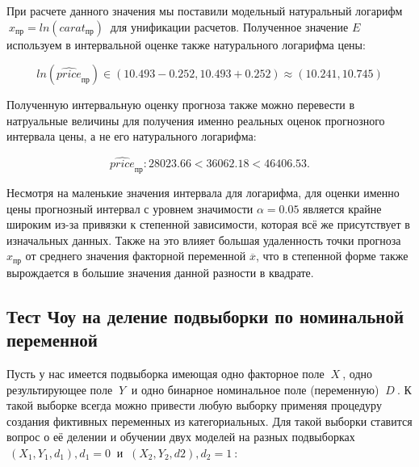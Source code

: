 \documentclass[
]{article}
\begin{document}
При расчете данного значения мы поставили модельный натуральный логарифм
\(\ x_\text{пр} = ln(carat_{\text{пр}})\ \) для унификации расчетов.
Полученное значение \(E\) используем в интервальной оценке также
натурального логарифма цены:

\[
ln(\hat{price}_{пр}) \in \left( 10.493 - 0.252, 10.493 + 0.252 \right) \approx \left( 10.241, 10.745 \right)
\]

Полученную интервальную оценку прогноза также можно перевести в
натруальные величины для получения именно реальных оценок прогнозного
интервала цены, а не его натурального логарифма:

\[
\hat{price}_{пр}: 28023.66 < 36062.18 < 46406.53.
\]

Несмотря на маленькие значения интервала для логарифма, для оценки
именно цены прогнозный интервал с уровнем значимости \(\alpha = 0.05\)
является крайне широким из-за привязки к степенной зависимости, которая
всё же присутствует в изначальных данных. Также на это влияет большая
удаленность точки прогноза \(x_{пр}\) от среднего значения факторной
переменной \(\overline{x}\), что в степенной форме также вырождается в
большие значения данной разности в квадрате.

\hypertarget{ux442ux435ux441ux442-ux447ux43eux443-ux43dux430-ux434ux435ux43bux435ux43dux438ux435-ux43fux43eux434ux432ux44bux431ux43eux440ux43aux438-ux43fux43e-ux43dux43eux43cux438ux43dux430ux43bux44cux43dux43eux439-ux43fux435ux440ux435ux43cux435ux43dux43dux43eux439}{%
\subsection{\texorpdfstring{\textbf{Тест Чоу на деление подвыборки по
номинальной
переменной}}{Тест Чоу на деление подвыборки по номинальной переменной}}\label{ux442ux435ux441ux442-ux447ux43eux443-ux43dux430-ux434ux435ux43bux435ux43dux438ux435-ux43fux43eux434ux432ux44bux431ux43eux440ux43aux438-ux43fux43e-ux43dux43eux43cux438ux43dux430ux43bux44cux43dux43eux439-ux43fux435ux440ux435ux43cux435ux43dux43dux43eux439}}

Пусть у нас имеется подвыборка имеющая одно факторное поле \(\ X\ \),
одно результирующее поле \(\ Y\ \) и одно бинарное номинальное поле
(переменную) \(\ D\ \). К такой выборке всегда можно привести любую
выборку применяя процедуру создания фиктивных переменных из
категориальных. Для такой выборки ставится вопрос о её делении и
обучении двух моделей на разных подвыборках
\(\ (X_1, Y_1, d_1), d_1 = 0\ \) и \(\ (X_2, Y_2, d2), d_2 = 1\ \):
\end{document}
